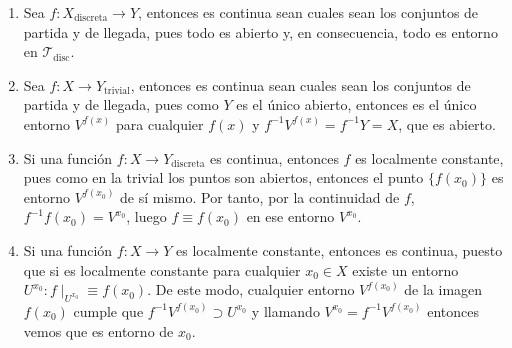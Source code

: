\begin{ej}
\begin{enumerate}
    \item Sea $f: X_{\text{discreta}} \rightarrow Y$, entonces es continua sean cuales sean los conjuntos de partida y de llegada, pues todo es abierto y, en consecuencia, todo es entorno en $\mathcal{T}_{\text{disc}}$.
    \item Sea $f: X \rightarrow Y_{\text{trivial}}$, entonces es continua sean cuales sean los conjuntos de partida y de llegada, pues como $Y$ es el único abierto, entonces es el único entorno $V^{f\left( x \right)}$ para cualquier $f(x)$ y $f^{-1}V^{f\left( x \right)} = f^{-1}Y = X$, que es abierto.
    \item Si una función $f: X \rightarrow Y_{\text{discreta}}$ es continua, entonces $f$ es localmente constante, pues como en la trivial los puntos son abiertos, entonces el punto $\{f\left( x_0 \right)\}$ es entorno $V^{f\left( x_0 \right)}$ de sí mismo. Por tanto, por la continuidad de $f$, $f^{-1}f\left( x_0 \right) = V^{x_0}$, luego $f \equiv f\left( x_0 \right)$ en ese entorno $V^{x_0}$.
    \item Si una función $f: X \rightarrow Y$ es localmente constante, entonces es continua, puesto que si es localmente constante para cualquier $x_0 \in X$ existe un entorno $U^{x_0} : f\mid_{U^{x_0}} \equiv f\left( x_0 \right)$. De este modo, cualquier entorno $V^{f\left( x_0 \right)}$ de la imagen $f(x_0)$ cumple que $f^{-1}V^{f\left( x_0 \right)} \supset U^{x_0}$ y llamando $V^{x_0} = f^{-1} V^{f\left( x_0 \right)}$ entonces vemos que es entorno de $x_0$.
\end{enumerate}
\end{ej}

